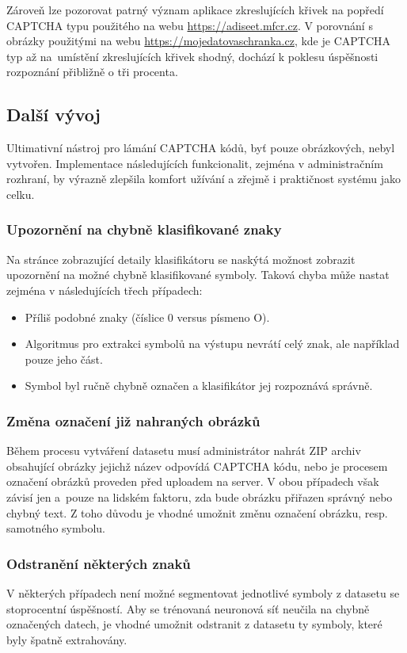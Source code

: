 \documentclass[
  field=ainfp,
  master=true,
  biblatex,
  sourcecodes=false,
  theorems=false,
  glossaries,
  index
]{kidiplom}
\begin{document}
Zároveň lze pozorovat patrný význam aplikace zkreslujících křivek na popředí CAPT\-CHA typu použitého na webu \url{https://adiseet.mfcr.cz}. V porov\-nání s ob\-rázky použitými na webu \url{https://mojedatovaschranka.cz}, kde je CAPTCHA typ až na~umístění zkreslujících křivek shodný, dochází k poklesu úspěšnosti rozpoznání přibližně o  tři procenta.

\subsection{Další vývoj}
Ultimativní nástroj pro lámání CAPTCHA kódů, byť pouze obrázkových, nebyl vytvořen. Implementace následujících funkcionalit, zejména v administračním rozhraní, by výrazně zlepšila komfort užívání a zřejmě i praktičnost systému jako celku.

\subsubsection*{Upozornění na chybně klasifikované znaky} 
Na stránce zobrazující detaily klasifikátoru se naskýtá možnost zobrazit upozornění na možné chybně klasifikované symboly. Taková chyba může nastat zejména v následujících třech případech: 
\begin{itemize}
\item Příliš podobné znaky (číslice 0 versus písmeno O).
\item Algoritmus pro extrakci symbolů na výstupu nevrátí celý znak, ale například pouze jeho část.
\item Symbol byl ručně chybně označen a klasifikátor jej rozpoznává správně.
\end{itemize}

\subsubsection*{Změna označení již nahraných obrázků} 
Během procesu vytváření datasetu musí administrátor nahrát ZIP archiv obsahující obrázky jejichž název odpovídá CAPTCHA kódu, nebo je procesem označení obrázků proveden před uploadem na server. V obou případech však závisí jen a~pouze na lidském faktoru, zda bude obrázku přiřazen správný nebo chybný text. Z toho důvodu je vhodné umožnit změnu označení obrázku, resp. samotného symbolu.

\subsubsection*{Odstranění některých znaků}
V některých případech není možné segmentovat jednotlivé symboly z datasetu se stoprocentní úspěšností. Aby se trénovaná neuronová síť neučila na chybně označených datech, je vhodné umožnit odstranit z datasetu ty symboly, které byly špatně extrahovány.
\end{document}

